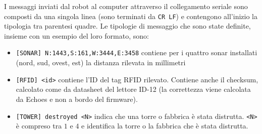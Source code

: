 I messaggi inviati dal robot al computer attraverso il collegamento seriale sono composti da una singola linea (sono terminati da \verb|CR LF|) e contengono all'inizio la tipologia tra parentesi quadre. Le tipologie di messaggio che sono state definite, insieme con un esempio del loro formato, sono:
\begin{itemize}
\item \verb|[SONAR] N:1443,S:161,W:3444,E:3458| contiene per i quattro sonar installati (nord, sud, ovest, est) la distanza rilevata in millimetri
\item \verb|[RFID] <id>| contiene l'ID del tag RFID rilevato. Contiene anche il checksum, calcolato come da datasheet del lettore ID-12 (la correttezza viene calcolata da Echoes e non a bordo del firmware).
\item \verb|[TOWER] destroyed <N>| indica che una torre o fabbrica è stata distrutta. \verb|<N>| è compreso tra $1$ e $4$ e identifica la torre o la fabbrica che è stata distrutta.
\end{itemize}